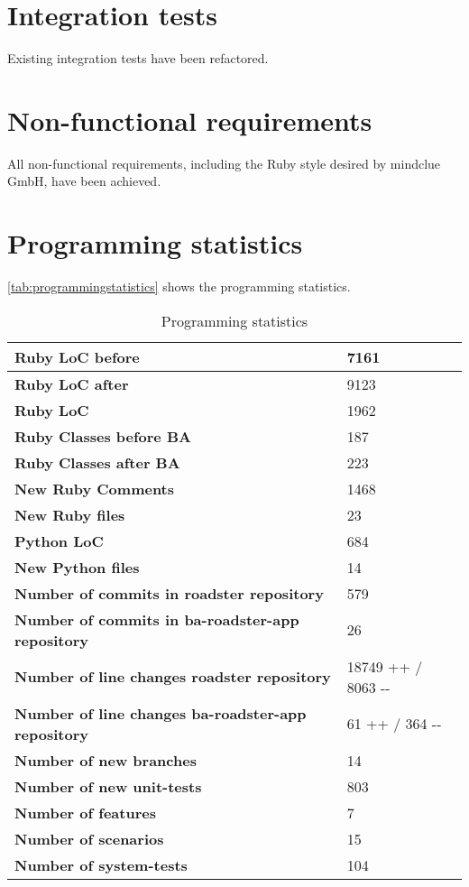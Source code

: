 \section{Integration tests}
Existing integration tests have been refactored.

\section{Non-functional requirements}
All non-functional requirements, including the Ruby style desired by mindclue
GmbH, have been achieved.


\section{Programming statistics}

\autoref{tab:programmingstatistics} shows the programming statistics.
\begin{table}[H]
  \centering
  \begin{tabular}{|m{50mm}|m{30mm}|}
   \hline
	\bf Ruby LoC before & 7161 \\
	\hline
	\bf Ruby LoC after & 9123 \\
	\hline
	\bf Ruby LoC & 1962 \\
	\hline
	\bf Ruby Classes before BA & 187 \\
	\hline
	\bf Ruby Classes after BA & 223 \\
	\hline
	\bf New Ruby Comments & 1468 \\
	\hline
	\bf New Ruby files & 23 \\
	\hline
	\bf Python LoC & 684 \\
	\hline
	\bf New Python files & 14 \\
	\hline
	\bf Number of commits in 
		\newline roadster repository & 579 \\
	\hline
	\bf Number of commits in 
		\newline ba-roadster-app repository & 26 \\
	\hline
	\bf Number of line changes 
		\newline roadster repository & 18749{\color{green!70} ++} / 8063{\color{red!70} -{}-} \\
	\hline
	\bf Number of line changes 
		\newline ba-roadster-app repository & 61{\color{green!70} ++} / 364{\color{red!70} -{}-} \\
	\hline
	\bf Number of new branches & 14 \\
	\hline
	\bf Number of new unit-tests & 803 \\
	\hline
	\bf Number of features & 7 \\
	\hline
	\bf Number of scenarios & 15 \\
	\hline
	\bf Number of system-tests & 104 \\
    \hline
  \end{tabular} \\
  \caption{Programming statistics}
  \label{tab:programmingstatistics}
\end{table}
